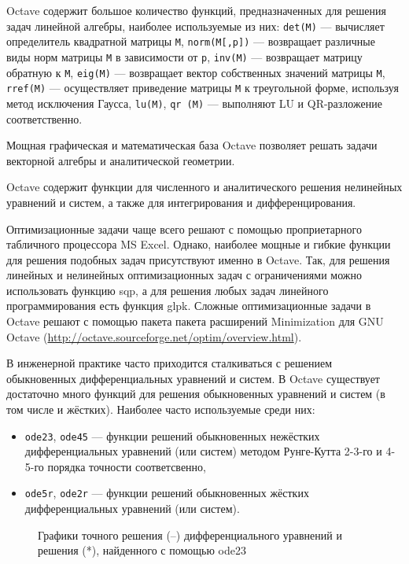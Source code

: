 \documentclass[10pt, a5paper]{article}
\begin{document}
Octave содержит большое количество функций, предназначенных для решения задач линейной алгебры, наиболее используемые из них: \verb!det(M)! --- вычисляет определитель квадратной матрицы \verb!M!, \verb!norm(M[,p])! --- возвращает различные виды норм матрицы \verb!M! в зависимости от \verb!p!, \verb!inv(M)! --- возвращает матрицу обратную к \verb!M!, \verb!eig(M)! --- возвращает вектор собственных значений матрицы \verb!M!, \verb!rref(M)! --- осуществляет приведение матрицы \verb!M! к треугольной форме, используя метод исключения Гаусса, \verb!lu(M)!, \verb!qr (M)! --- выполняют LU и QR-разложение соответственно. 

Мощная графическая и математическая база  Octave позволяет решать задачи векторной алгебры и аналитической геометрии.

Octave содержит функции для численного и аналитического решения нелинейных уравнений и систем, а также для интегрирования и дифференцирования.

Оптимизационные задачи чаще всего решают с помощью проприетарного табличного процессора MS Excel. Однако, наиболее мощные и гибкие функции для решения подобных задач присутствуют именно в Octave. Так, для  решения линейных и нелинейных оптимизационных задач с ограничениями можно использовать функцию sqp, а для решения любых задач линейного программирования есть функция glpk. Сложные оптимизационные задачи в Octave решают с помощью пакета пакета расширений Minimization для GNU Octave (\url{http://octave.sourceforge.net/optim/overview.html}).

В инженерной практике часто приходится сталкиваться с решением обыкновенных дифференциальных уравнений и систем. В Octave существует достаточно много функций для решения обыкновенных уравнений и систем (в том числе и жёстких). Наиболее часто используемые среди них:
\begin{itemize}
\item \verb!ode23!, \verb!ode45! --- функции решений обыкновенных нежёстких дифференциальных уравнений (или систем) методом Рунге-Кутта 2-3-го и 4-5-го порядка точности соответсвенно,
\item \verb!ode5r!, \verb!ode2r! --- функции решений обыкновенных жёстких дифференциальных уравнений (или систем).
\end{itemize}

\begin{figure}[ht]
\caption{Графики точного решения (--) дифференциального уравнений и решения (*), найденного с помощью ode23}
\label{pic:4}
\end{figure}
\end{document}
